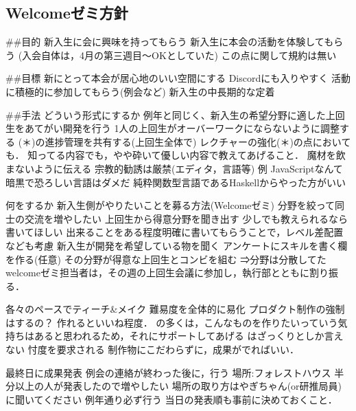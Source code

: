 \subsection*{Welcomeゼミ方針}


##目的
新入生に会に興味を持ってもらう 
新入生に本会の活動を体験してもらう
(入会自体は，4月の第三週目～OKとしていた)
この点に関して規約は無い

##目標
新\firstGrade{}にとって本会が居心地のいい空間にする
Discordにも入りやすく
活動に積極的に参加してもらう(例会など)
新入生の中長期的な定着


##手法
    どういう形式にするか
        例年と同じく、新入生の希望分野に適した上回生をあてがい開発を行う
        1人の上回生がオーバーワークにならないように調整する
        (＊)\firstGrade{}の進捗管理を共有する(上回生全体で)
        レクチャーの強化(＊)の点においても．
        知ってる内容でも，やや砕いて優しい内容で教えてあげること．
        魔材を飲まないように伝える
        宗教的勧誘は厳禁(エディタ，言語等)
            例
            JavaScriptなんて暗黒で恐ろしい言語はダメだ
            純粋関数型言語であるHaskellからやった方がいい

    何をするか
        新入生側がやりたいことを募る方法(Welcomeゼミ)
            分野を絞って\firstGrade{}同士の交流を増やしたい
            上回生から得意分野を聞き出す
        少しでも教えられるなら書いてほしい
            出来ることをある程度明確に書いてもらうことで，レベル差配置なども考慮
        新入生が開発を希望している物を聞く
            アンケートにスキルを書く欄を作る(任意)
        その分野が得意な上回生とコンビを組む
            ⇒分野は分散してた
            welcomeゼミ担当者は，その週の上回生会議に参加し，執行部とともに割り振る．

        各々のペースでティーチ&メイク
            難易度を全体的に易化
            プロダクト制作の強制はするの？
            作れるといいね程度．
                \firstGrade{}の多くは，こんなものを作りたいっていう気持ちはあると思われるため，それにサポートしてあげる
                \firstGrade{}はざっくりとしか言えない
                忖度を要求される
                制作物にこだわらずに，成果がでればいい．

        最終日に成果発表
            例会の連絡が終わった後に，行う
            場所:フォレストハウス
                半分以上の人が発表したので増やしたい
                場所の取り方はやぎちゃん(or研推局員)に聞いてください
            例年通り必ず行う
            当日の発表順も事前に決めておくこと．
             
